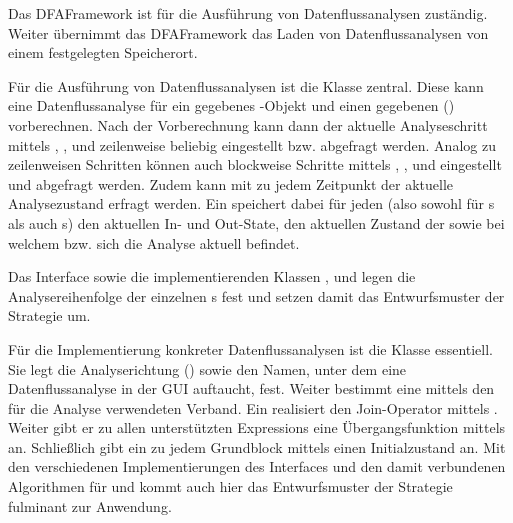 
Das DFAFramework ist für die Ausführung von Datenflussanalysen zuständig.
Weiter übernimmt das DFAFramework das Laden von Datenflussanalysen von einem festgelegten Speicherort.

Für die Ausführung von Datenflussanalysen ist die Klasse  zentral.
Diese kann eine Datenflussanalyse für ein gegebenes -Objekt und einen gegebenen  () vorberechnen.
Nach der Vorberechnung kann dann der aktuelle Analyseschritt mittels , ,  und  zeilenweise beliebig eingestellt bzw. abgefragt werden. 
Analog zu zeilenweisen Schritten können auch blockweise Schritte mittels , ,  und  eingestellt und abgefragt werden.
Zudem kann mit  zu jedem Zeitpunkt der aktuelle Analysezustand erfragt werden.
Ein  speichert dabei für jeden  (also sowohl für s als auch s) den aktuellen In- und Out-State, den aktuellen Zustand der  sowie bei welchem  bzw.  sich die Analyse aktuell befindet.

Das Interface  sowie die implementierenden Klassen ,  und  legen die Analysereihenfolge der einzelnen s fest und setzen damit das Entwurfsmuster der Strategie um.

Für die Implementierung konkreter Datenflussanalysen ist die Klasse  essentiell.
Sie legt die Analyserichtung () sowie den Namen, unter dem eine Datenflussanalyse in der GUI auftaucht, fest.
Weiter bestimmt eine  mittels  den für die Analyse verwendeten Verband.
Ein  realisiert den Join-Operator mittels .
Weiter gibt er zu allen unterstützten Expressions eine Übergangsfunktion mittels  an.
Schließlich gibt ein  zu jedem Grundblock mittels  einen Initialzustand an. 
Mit den verschiedenen Implementierungen des Interfaces  und den damit verbundenen Algorithmen für  und  kommt auch hier das Entwurfsmuster der Strategie fulminant zur Anwendung.

